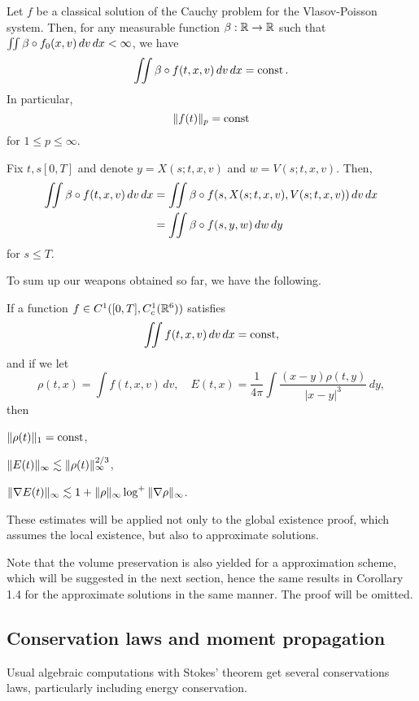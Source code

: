 \documentclass[11pt]{amsart}
\begin{document}
\begin{cor}
Let $f$ be a classical solution of the Cauchy problem for the Vlasov-Poisson system.
Then, for any measurable function $\beta:\mathbb{R}\to\mathbb{R}$ such that $\iint\beta\circ f_0(x,v)\,dv\,dx<\infty$, we have
\[\iint\beta\circ f(t,x,v)\,dv\,dx=\operatorname{const}.\]
In particular,
\[\|f(t)\|_p=\operatorname{const}\]
for $1\le p\le\infty$.
\end{cor}
\begin{pf}
Fix $t,s[0,T]$ and denote $y=X(s;t,x,v)$ and $w=V(s;t,x,v)$.
Then,
\begin{align*}
\iint\beta\circ f(t,x,v)\,dv\,dx
&=\iint\beta\circ f(s,X(s;t,x,v),V(s;t,x,v))\,dv\,dx\\
&=\iint\beta\circ f(s,y,w)\,dw\,dy
\end{align*}
for $s\le T$.
\end{pf}

To sum up our weapons obtained so far, we have the following.
\begin{cor}
If a function $f\in C^1([0,T],C_c^1(\mathbb{R}^6))$ satisfies
\[\iint f(t,x,v)\,dv\,dx=\operatorname{const},\]
and if we let
\[\rho(t,x)=\int f(t,x,v)\,dv,\quad E(t,x)=\frac1{4\pi}\int\frac{(x-y)\rho(t,y)}{|x-y|^3}\,dy,\]
then
\begin{ol}
\item $\|\rho(t)\|_1=\operatorname{const}$,
\item $\|E(t)\|_\infty\lesssim\|\rho(t)\|_\infty^{2/3}$,
\item $\|\nabla E(t)\|_\infty\lesssim1+\|\rho\|_\infty\log^+\|\nabla\rho\|_\infty$.
\end{ol}
\end{cor}
These estimates will be applied not only to the global existence proof, which assumes the local existence, but also to approximate solutions.

\begin{rmk}
Note that the volume preservation is also yielded for a approximation scheme, which will be suggested in the next section, hence the same results in Corollary 1.4 for the approximate solutions in the same manner.
The proof will be omitted.
\end{rmk}


\subsection{Conservation laws and moment propagation}
Usual algebraic computations with Stokes' theorem get several conservations laws, particularly including energy conservation.
\end{document}
